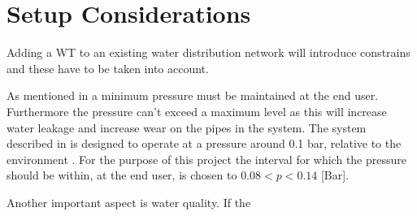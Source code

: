 

\section{Setup Considerations}



Adding a WT to an existing water distribution network will introduce constrains and these have to be taken into account. 

As mentioned in  a minimum pressure must be maintained at the end user. Furthermore the pressure can't exceed a maximum level as this will increase water leakage and increase wear on the pipes in the system. The system described in  is designed to operate at a pressure around 0.1 bar, relative to the environment \cite{master_aau}. For the purpose of this project the interval for which the pressure should be within, at the end user, is chosen to $0.08 < p < 0.14$ [Bar].

Another important aspect is water quality. If the  











 
 